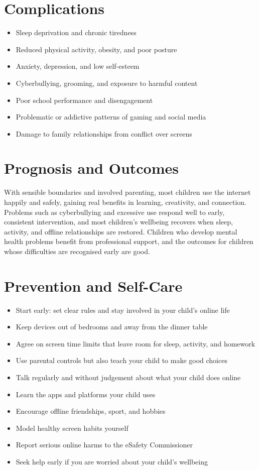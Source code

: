 \section*{Complications}
\begin{itemize}
    \item Sleep deprivation and chronic tiredness
    \item Reduced physical activity, obesity, and poor posture
    \item Anxiety, depression, and low self-esteem
    \item Cyberbullying, grooming, and exposure to harmful content
    \item Poor school performance and disengagement
    \item Problematic or addictive patterns of gaming and social media
    \item Damage to family relationships from conflict over screens
\end{itemize}

\section*{Prognosis and Outcomes}
With sensible boundaries and involved parenting, most children use the internet happily and safely, gaining real benefits in learning, creativity, and connection. Problems such as cyberbullying and excessive use respond well to early, consistent intervention, and most children's wellbeing recovers when sleep, activity, and offline relationships are restored. Children who develop mental health problems benefit from professional support, and the outcomes for children whose difficulties are recognised early are good.

\section*{Prevention and Self-Care}
\begin{itemize}
    \item Start early: set clear rules and stay involved in your child's online life
    \item Keep devices out of bedrooms and away from the dinner table
    \item Agree on screen time limits that leave room for sleep, activity, and homework
    \item Use parental controls but also teach your child to make good choices
    \item Talk regularly and without judgement about what your child does online
    \item Learn the apps and platforms your child uses
    \item Encourage offline friendships, sport, and hobbies
    \item Model healthy screen habits yourself
    \item Report serious online harms to the eSafety Commissioner
    \item Seek help early if you are worried about your child's wellbeing
\end{itemize}


